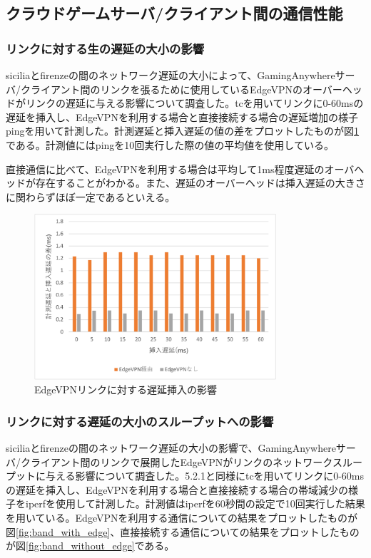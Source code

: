 \subsection{クラウドゲームサーバ/クライアント間の通信性能}

\subsubsection{リンクに対する生の遅延の大小の影響}
siciliaとfirenzeの間のネットワーク遅延の大小によって、GamingAnywhereサーバ/クライアント間のリンクを張るために使用しているEdgeVPNのオーバーヘッドがリンクの遅延に与える影響について調査した。tc\cite{iproute2}を用いてリンクに0-60msの遅延を挿入し、EdgeVPNを利用する場合と直接接続する場合の遅延増加の様子ping\cite{ping}を用いて計測した。計測遅延と挿入遅延の値の差をプロットしたものが図\ref{fig:ratency}である。計測値にはpingを10回実行した際の値の平均値を使用している。

直接通信に比べて、EdgeVPNを利用する場合は平均して1ms程度遅延のオーバヘッドが存在することがわかる。また、遅延のオーバーヘッドは挿入遅延の大きさに関わらずほぼ一定であるといえる。

\begin{figure}[t]
    \centering
    \includegraphics[width=0.8\textwidth,keepaspectratio,clip]{img/graph_ratency.pdf}
    \caption{EdgeVPNリンクに対する遅延挿入の影響}
    \label{fig:ratency}
\end{figure}

\subsubsection{リンクに対する遅延の大小のスループットへの影響}
siciliaとfirenzeの間のネットワーク遅延の大小の影響で、GamingAnywhereサーバ/クライアント間のリンクで展開したEdgeVPNがリンクのネットワークスループットに与える影響について調査した。5.2.1と同様にtcを用いてリンクに0-60msの遅延を挿入し、EdgeVPNを利用する場合と直接接続する場合の帯域減少の様子をiperf\cite{iperf}を使用して計測した。計測値はiperfを60秒間の設定で10回実行した結果を用いている。EdgeVPNを利用する通信についての結果をプロットしたものが図\ref{fig:band_with_edge}、直接接続する通信についての結果をプロットしたものが図\ref{fig:band_without_edge}である。


